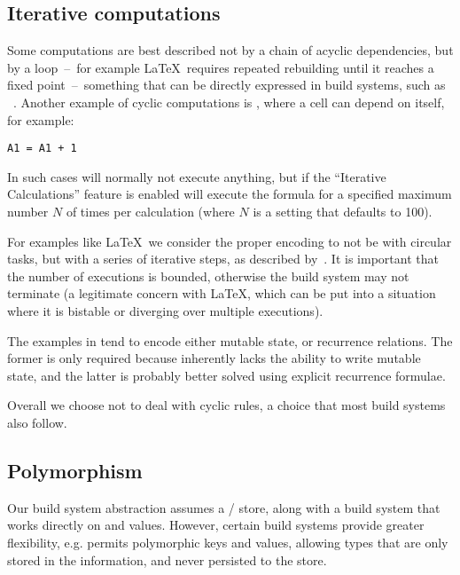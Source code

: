 \subsection{Iterative computations}\label{sec-iterative-compute}

Some computations are best described not by a chain of acyclic dependencies,
but by a loop~--~for example \LaTeX~requires repeated rebuilding until it
reaches a fixed point~--~something that can be directly expressed in build
systems, such as \Pluto~\cite{erdweg2015pluto}. Another example of cyclic
computations is \Excel, where a cell can depend on itself, for example:

\begin{verbatim}
A1 = A1 + 1
\end{verbatim}

\noindent
In such cases \Excel will normally not execute anything, but if the
``Iterative Calculations'' feature is enabled will execute the formula for a
specified maximum number $N$ of times per calculation (where $N$ is a
setting that defaults to 100).

For examples like \LaTeX~we consider the proper encoding to not be with circular
tasks, but with a series of iterative steps, as described
by~\citet{shake-fixed-point}. It is important that the number of executions is
bounded, otherwise the build system may not terminate (a legitimate concern
with \LaTeX, which can be put into a situation where it is bistable or diverging
over multiple executions).

The examples in \Excel tend to encode either mutable state, or recurrence
relations. The former is only required because \Excel inherently lacks the
ability to write mutable state, and the latter is probably better solved using
explicit recurrence formulae.

Overall we choose not to deal with cyclic rules, a choice that most build
systems also follow.

\subsection{Polymorphism}\label{sec-polymorphism}

Our build system abstraction assumes a / store, along with a build
system that works directly on  and  values. However, certain build
systems provide greater flexibility, e.g. \Shake permits polymorphic keys and
values, allowing types that are only stored in the \Shake information, and never
persisted to the store.

